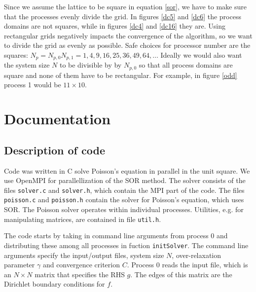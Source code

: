 \documentclass[10pt]{article}
\begin{document}
Since we assume the lattice to be square in equation \ref{sor}, we have to make sure that the processes evenly divide the grid. In figures \ref{dc5} and \ref{dc6} the process domains are not squares, while in figures \ref{dc4} and \ref{dc16} they are. Using rectangular grids negatively impacts the convergence of the algorithm, so we want to divide the grid as evenly as possible. Safe choices for processor number are the squares: $N_p = N_{p, 0} N_{p, 1} = 1, 4, 9, 16, 25, 36, 49, 64, \ldots$ Ideally we would also want the system size $N$ to be divisible by by $N_{p, 0}$ so that all process domains are square and none of them have to be rectangular. For example, in figure \ref{odd} process 1 would be $11\times10$.

\section{Documentation} \label{doc}

\subsection{Description of code}

Code was written in C solve Poisson's equation in parallel in the unit square. We use OpenMPI for parallellization of the SOR method. The solver consists of the files \verb|solver.c| and \verb|solver.h|, which contain the MPI part of the code. The files \verb|poisson.c| and \verb|poisson.h| contain the solver for Poisson's equation, which uses SOR. The Poisson solver operates within individual processes. Utilities, e.g. for manipulating matrices, are contained in file \verb|util.h|.


The code starts by taking in command line arguments from process 0 and distributing these among all processes in fuction \verb|initSolver|. The command line arguments specify the input/output files, system size $N$, over-relaxation parameter $\gamma$ and convergence criterion $C$. Process 0 reads the input file, which is an $N \times N$ matrix that specifies the RHS $g$. The edges of this matrix are the Dirichlet boundary conditions for $f$.
\end{document}
